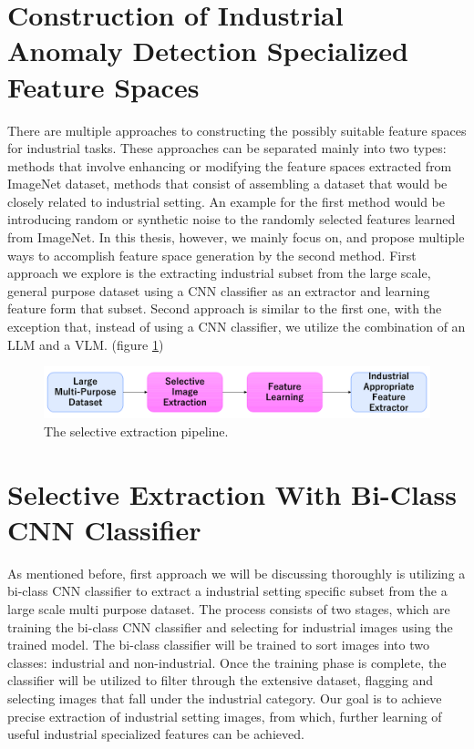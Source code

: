 \section{Construction of Industrial Anomaly Detection Specialized Feature Spaces}
There are multiple approaches to constructing the possibly suitable feature spaces for industrial tasks. These approaches can be separated mainly into two types: methods that involve enhancing or modifying the feature spaces extracted from ImageNet dataset, methods that consist of assembling a dataset that would be closely related to industrial setting. An example for the first method would be introducing random or synthetic noise to the randomly selected features learned from ImageNet. In this thesis, however, we mainly focus on, and propose multiple ways to accomplish feature space generation by the second method. First approach we explore is the extracting industrial subset from the large scale, general purpose dataset using a CNN classifier as an extractor and learning feature form that subset. Second approach is similar to the first one, with the exception that, instead of using a CNN classifier, we utilize the combination of an LLM and a VLM. (figure \ref{fig:selective_extraction})

\begin{figure}[h]
	\begin{center}
		\includegraphics[width=1.0\linewidth]{Chapter_3/selective_extraction.png}
	\end{center}
	\caption{The selective extraction pipeline.}
	\label{fig:selective_extraction}
\end{figure} 	

\section{Selective Extraction With Bi-Class CNN Classifier}
\label{cnn extraction}
As mentioned before, first approach we will be discussing thoroughly is utilizing a bi-class CNN classifier to extract a industrial setting specific subset from the a large scale multi purpose dataset. The process consists of two stages, which are training the bi-class CNN classifier and selecting for industrial images using the trained model. The bi-class classifier will be trained to sort images into two classes: industrial and non-industrial. Once the training phase is complete, the classifier will be utilized to filter through the extensive dataset, flagging and selecting images that fall under the industrial category. Our goal is to achieve precise extraction of industrial setting images, from which, further learning of useful industrial specialized features can be achieved. 

